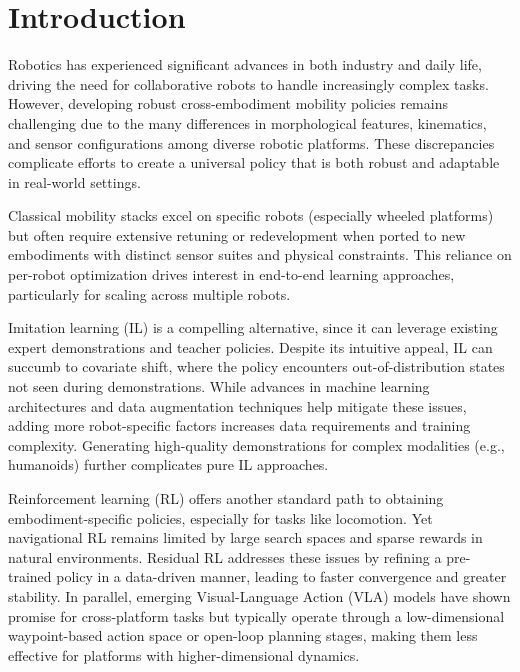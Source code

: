 \documentclass[letterpaper, 10 pt,conference]{ieeeconf}
\begin{document}
\section{Introduction}
\label{sec:intro}

Robotics has experienced significant advances in both industry and daily life, driving the need for collaborative robots to handle increasingly complex tasks. However, developing robust cross-embodiment mobility policies remains challenging due to the many differences in morphological features, kinematics, and sensor configurations among diverse robotic platforms\cite{doshi2024scaling, xu2023xskill, yang2024pushing}. These discrepancies complicate efforts to create a universal policy that is both robust and adaptable in real-world settings.

Classical mobility stacks \cite{macenski2020marathon2, liu2015autonomous} excel on specific robots (especially wheeled platforms) but often require extensive retuning or redevelopment when ported to new embodiments with distinct sensor suites and physical constraints. This reliance on per-robot optimization drives interest in end-to-end learning approaches\cite{liu2024x,xu2021machine}, particularly for scaling across multiple robots.

Imitation learning (IL) is a compelling alternative, since it can leverage existing expert demonstrations and teacher policies. Despite its intuitive appeal, IL can succumb to covariate shift\cite{chang2021mitigating}, where the policy encounters out-of-distribution states not seen during demonstrations. While advances in machine learning architectures\cite{wang2023drivedreamer,popov2024mitigating,feng2025survey} and data augmentation techniques\cite{ross2011reduction} help mitigate these issues, adding more robot-specific factors increases data requirements and training complexity. Generating high-quality demonstrations for complex modalities (e.g., humanoids) further complicates pure IL approaches.

Reinforcement learning (RL) \cite{zhu2021deep} offers another standard path to obtaining embodiment-specific policies, especially for tasks like locomotion. Yet navigational RL remains limited by large search spaces and sparse rewards in natural environments. Residual RL \cite{johannink2019residual,ankile2024imitation} addresses these issues by refining a pre-trained policy in a data-driven manner, leading to faster convergence and greater stability. In parallel, emerging Visual-Language Action (VLA)\cite{yang2024pushing,doshi2024scaling, Black2024, kim24openvla} models have shown promise for cross-platform tasks but typically operate through a low-dimensional waypoint-based action space or open-loop planning stages, making them less effective for platforms with higher-dimensional dynamics.
\end{document}
